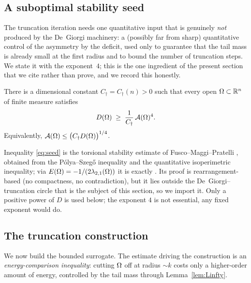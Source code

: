 \subsection{A suboptimal stability seed}\label{ssec:seed}

The truncation iteration needs one quantitative input that is genuinely
\emph{not} produced by the De~Giorgi machinery: a (possibly far from
sharp) quantitative control of the asymmetry by the deficit, used only to
guarantee that the tail mass is already small at the first radius and to
bound the number of truncation steps. We state it with the exponent~$4$;
this is the one ingredient of the present section that we cite rather than
prove, and we record this honestly.

\begin{lemma}\label{lem:seed}
There is a dimensional constant $C_\dagger=C_\dagger(n)>0$ such that every
open $\Omega\subset\mathbb{R}^n$ of finite measure satisfies
\begin{equation}\label{eq:seed}
   D(\Omega)\;\ge\;\frac{1}{C_\dagger}\,\mathcal{A}(\Omega)^{4}.
\end{equation}
Equivalently, $\mathcal{A}(\Omega)\le\bigl(C_\dagger D(\Omega)\bigr)^{1/4}$.
\end{lemma}

\begin{remark}\label{rem:seed-status}
Inequality \eqref{eq:seed} is the torsional stability estimate of
Fusco--Maggi--Pratelli \cite{FMP}, obtained from the
P\'olya--Szeg\H{o} inequality and the quantitative isoperimetric
inequality; via $E(\Omega)=-1/(2\lambda_{2,1}(\Omega))$ it is exactly
\cite[Lemma~5.2]{BDV}. Its proof is rearrangement-based (no compactness,
no contradiction), but it lies outside the De~Giorgi--truncation circle
that is the subject of this section, so we import it. Only a positive
power of $D$ is used below; the exponent $4$ is not essential, any fixed
exponent would do.
\end{remark}

\subsection{The truncation construction}\label{ssec:truncation}

We now build the bounded surrogate. The estimate driving the construction
is an \emph{energy-comparison inequality}: cutting $\Omega$ off at radius
$\sim k$ costs only a higher-order amount of energy, controlled by the
tail mass through Lemma~\ref{lem:Linfty}.

